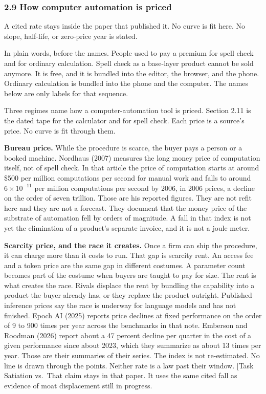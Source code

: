 \documentclass[
  10pt,
]{article}
\begin{document}
\subsubsection{2.9 How computer automation is
priced}\label{how-computer-automation-is-priced}

A cited rate stays inside the paper that published it. No curve is fit
here. No slope, half-life, or zero-price year is stated.

In plain words, before the names. People used to pay a premium for spell
check and for ordinary calculation. Spell check as a base-layer product
cannot be sold anymore. It is free, and it is bundled into the editor,
the browser, and the phone. Ordinary calculation is bundled into the
phone and the computer. The names below are only labels for that
sequence.

Three regimes name how a computer-automation tool is priced. Section
2.11 is the dated tape for the calculator and for spell check. Each
price is a source's price. No curve is fit through them.

\textbf{Bureau price.} While the procedure is scarce, the buyer pays a
person or a booked machine. Nordhaus (2007) measures the long money
price of computation itself, not of spell check. In that article the
price of computation starts at around \$500 per million computations per
second for manual work and falls to around \(6 \times 10^{-11}\) per
million computations per second by 2006, in 2006 prices, a decline on
the order of seven trillion. Those are his reported figures. They are
not refit here and they are not a forecast. They document that the money
price of the substrate of automation fell by orders of magnitude. A fall
in that index is not yet the elimination of a product's separate
invoice, and it is not a joule meter.

\textbf{Scarcity price, and the race it creates.} Once a firm can ship
the procedure, it can charge more than it costs to run. That gap is
scarcity rent. An access fee and a token price are the same gap in
different costumes. A parameter count becomes part of the costume when
buyers are taught to pay for size. The rent is what creates the race.
Rivals displace the rent by bundling the capability into a product the
buyer already has, or they replace the product outright. Published
inference prices say the race is underway for language models and has
not finished. Epoch AI (2025) reports price declines at fixed
performance on the order of 9 to 900 times per year across the
benchmarks in that note. Emberson and Roodman (2026) report about a 47
percent decline per quarter in the cost of a given performance since
about 2023, which they summarize as about 13 times per year. Those are
their summaries of their series. The index is not re-estimated. No line
is drawn through the points. Neither rate is a law past their window.
{[}Task Satiation vs.~That claim stays in that paper. It uses the same
cited fall as evidence of moat displacement still in progress.
\end{document}

